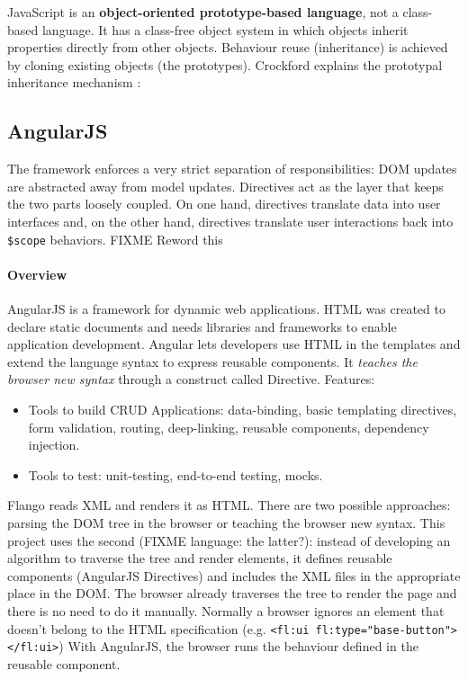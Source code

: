 JavaScript is an \textbf{object-oriented prototype-based language}, not a class-based language.
It has a class-free object system in which objects inherit properties directly from other objects.
Behaviour reuse (inheritance) is achieved by cloning existing objects (the prototypes).
Crockford explains the prototypal inheritance mechanism \cite{Crockford:proto}:

\subsection{AngularJS}
The framework enforces a very strict separation of responsibilities: \ac{DOM} updates are abstracted away from model updates. 
Directives act as the layer that keeps the two parts loosely coupled.
On one hand, directives translate data into user interfaces and, on the other hand, directives translate user interactions back into \texttt{\$scope} behaviors. FIXME Reword this

\paragraph{Overview} AngularJS is a framework for dynamic web applications.
\ac{HTML} was created to declare static documents and needs libraries and frameworks to enable application development.
Angular lets developers use \ac{HTML} in the templates and extend the language syntax to express reusable components.
It \textit{teaches the browser new syntax} through a construct called Directive.
Features:
\begin{itemize}
    \item Tools to build \ac{CRUD} Applications: data-binding, basic templating directives, form validation, routing, deep-linking, reusable components, dependency injection.
    \item Tools to test: unit-testing, end-to-end testing, mocks.
\end{itemize}

Flango \cm reads \ac{XML} and renders it as \ac{HTML}.
There are two possible approaches: parsing the \ac{DOM} tree in the browser or teaching the browser new syntax.
This project uses the second (FIXME language: the latter?): instead of developing an algorithm to traverse the tree and render elements, it defines reusable components (AngularJS Directives) and includes the \ac{XML} files in the appropriate place in the \ac{DOM}. 
The browser already traverses the tree to render the page and there is no need to do it manually.
Normally a browser ignores an element that doesn't belong to the \ac{HTML} specification (e.g. \lstinline$<fl:ui fl:type="base-button"></fl:ui>$)
With AngularJS, the browser runs the behaviour defined in the reusable component.

